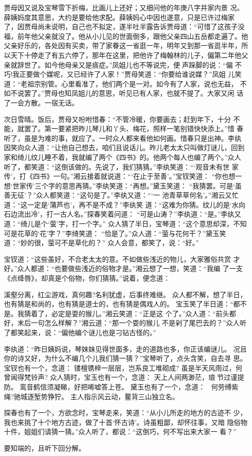 贾母因又说及宝琴雪下折梅，比画儿上还好；又细问他的年庚八字并家内景
况。薛姨妈度其意思，大约是要给他求配。薛姨妈心中因也遂意，只是已许过梅家
了，因贾母尚未说明，自己也不拟定，遂半吐半露告诉贾母道：“可惜了这孩子没
福，前年他父亲就没了。他从小儿见的世面倒多，跟他父亲四山五岳都走遍了。他
父亲好乐的，各处因有买卖，带了家眷这一省逛一年，明年又到那一省逛半年，所
以天下十停走了有五六停了，那年在这里，把他许了梅翰林的儿子，偏第二年他父
亲就辞世了。如今他母亲又是痰症。”凤姐儿也不等说完，便声跺脚的说：“偏
不巧!我正要做个媒呢，又已经许了人家！”贾母笑道：“你要给谁说媒？”凤姐
儿笑道：“老祖宗别管。心里看准了，他们两个是一对。如今有了人家，说也无益，
不如不说罢了。”贾母也知凤姐儿的意思，听见已有人家，也就不提了。大家又闲
话了一会方散。一宿无话。

次日雪晴。饭后，贾母又吩咐惜春：“不管冷暖，你要画去；赶到年下，十分
不能，就罢了。第一要紧把昨儿琴儿和丫头、梅花，照样一笔别错快快添上。”惜
春听了，虽是为难的事，就应了。一时众人都来看他如何画。惜春只是出神。李纨
因笑向众人道：“让他自己想去，咱们且说话儿。昨儿老太太只叫做灯谜儿，回到
家和绮儿纹儿睡不着，我就编了两个《四书》的。他两个每人也编了两个。”众人
听了，都笑道：“这倒该做的。先说了，我们猜猜。”李纨笑道：“‘观音未有世
家传’，打《四书》一句。”湘云接着就说道：“‘在止于至善’。”宝钗笑道：
“你也想一想‘世家传’三个字的意思再猜。”李纨笑道：“再想。”黛玉笑道：
“我猜罢。可是‘虽善无征’？”众人都笑道：“这句是了。”李纨又道：“‘一
池青草草何名’。”湘云又忙道：“这一定是‘蒲芦也’，再不是不成？”李纨笑
道：“这难为你猜。纹儿的是‘水向石边流出冷’，打一古人名。”探春笑着问道：
“可是山涛？”李纨道：“是。”李纨又道：“绮儿是个‘萤’字，打一个字。”
众人猜了半日，宝琴道：“这个意思却深，不知可是花草的‘花’字？”李绮笑道：
“恰是了。”众人道：“萤与花何干？”黛玉笑道：“妙的很，萤可不是草化的？”
众人会意，都笑了，说：“好。”

宝钗道：“这些虽好，不合老太太的意。不如做些浅近的物儿，大家雅俗共赏
才好。”众人都道：“也要做些浅近的俗物才是。”湘云想了一想，笑道：“我编
了一支《点绛唇》，却真是个俗物，你们猜猜。”说着，便念道：

溪壑分离，红尘游戏，真何趣?名利犹虚，后事终难继。
众人都不解，想了半日，也有猜是和尚的，也有猜是道士的，也有猜是偶戏人的。
宝玉笑了半日道：“都不是。我猜着了，必定是耍的猴儿。”湘云笑道：“正是这
个了。”众人道：“前头都好，末后一句怎么样解？”湘云道：“那一个耍的猴儿
不是剁了尾巴去的？”众人听了都笑起来，说：“偏他编个谜儿也是刁钻古怪的。”

李纨道：“昨日姨妈说，琴妹妹见得世面多，走的道路也多，你正该编谜儿。
况且你的诗又好，为什么不编几个儿我们猜一猜？”宝琴听了，点头含笑，自去寻
思。宝钗也有一个，念道：
镂檀镌梓一层层，岂系良工堆砌成?
虽是半天风雨过，何曾闻得梵铃声?
众人猜时，宝玉也有一个，念道：
天上人间两渺茫，琅节过谨提防。
鸾音鹤信须凝睇，好把唏嘘答上苍。
黛玉也有了一个，念道：
何劳缚紫绳?驰城逐堑势狰狞。
主人指示风云动，鳌背三山独立名。

探春也有了一个，方欲念时，宝琴走来，笑道：“从小儿所走的地方的古迹不
少，我也来挑了十个地方古迹，做了十首‘怀古诗’。诗虽粗鄙，却怀往事，又暗
隐俗物十件，姐姐们请猜一猜。”众人听了，都说：“这倒巧，何不写出来大家一
看？”

要知端的，且听下回分解。